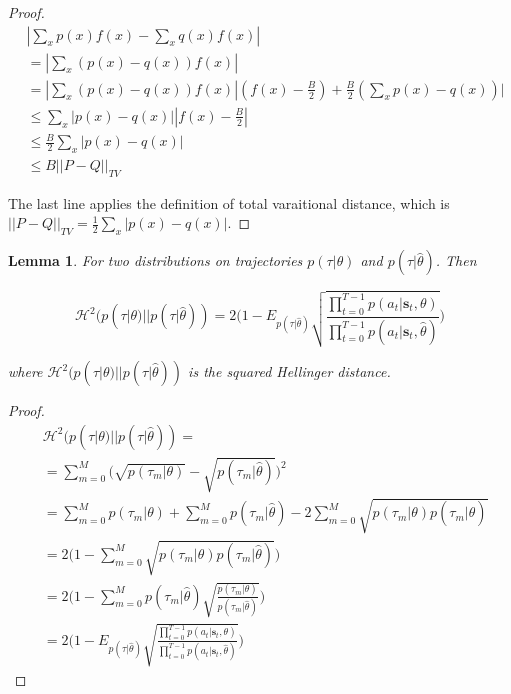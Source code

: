 \documentclass[conference]{article}
\newcommand{\bs}{\mathbf{s}}
\newtheorem{lemma}[theorem]{Lemma}
\newtheorem{proof}[theorem]{proof}
\begin{document}
\begin{proof}
\begin{align}
&|\sum_x p(x)f(x) - \sum_x q(x)f(x)| \nonumber \\
&= |\sum_x (p(x)-q(x))f(x)|  \nonumber \\
&=|\sum_x (p(x)-q(x))f(x)|(f(x) - \frac{B}{2}) + \frac{B}{2}(\sum_x p(x) - q(x))| \nonumber \\
&\leq \sum_x |p(x)-q(x)||f(x) - \frac{B}{2}| \nonumber \\
&\leq \frac{B}{2} \sum_x |p(x)-q(x)|\nonumber \\
& \leq B ||P-Q||_{TV}
\end{align}

The last line applies the definition of total varaitional distance, which is $||P-Q||_{TV} = \frac{1}{2} \sum_x |p(x)-q(x)|$.

\end{proof}

\begin{lemma}\label{lem:hellinger_exp}
For two distributions on trajectories $p(\tau|\theta)$ and $p(\tau|\hat{\theta})$. Then

$$\mathcal{H}^2(p(\tau|\theta)||p(\tau|\hat{\theta})) = 2\big(1-E_{p(\tau|\hat{\theta})} \sqrt{\frac{\prod^{T-1}_{t=0} p(a_t|\bs_t,\theta)}{\prod^{T-1}_{t=0} p(a_t|\bs_t,\hat{\theta})}}\big)$$

where $\mathcal{H}^2(p(\tau|\theta)||p(\tau|\hat{\theta}))$ is the squared Hellinger distance. 

\end{lemma}

\begin{proof}
\begin{align}
&\mathcal{H}^2(p(\tau|\theta) || p(\tau|\hat{\theta})) = \nonumber\\ 
&=\sum^M_{m=0} \big(\sqrt{p(\tau_m|\theta)} - \sqrt{p(\tau_m|\hat{\theta})} \big)^2 \nonumber \\ 
&=\sum^M_{m=0} p(\tau_m|\theta) + \sum^M_{m=0} p(\tau_m|\hat{\theta}) - 2 \sum^M_{m=0} \sqrt{p(\tau_m|\theta)p(\tau_m|\hat{\theta})} \nonumber \\
& = 2\big(1 - \sum^M_{m=0} \sqrt{p(\tau_m|\theta)p(\tau_m|\hat{\theta})} \big)\\
& =  2\big(1 - \sum^M_{m=0} p(\tau_m|\hat{\theta})\sqrt{\frac{p(\tau_m|\theta)}{p(\tau_m|\hat{\theta})} }\big)\\
&= 2\big(1-E_{p(\tau|\hat{\theta})} \sqrt{ \frac{\prod^{T-1}_{t=0} p(a_t|\bs_t,\theta)}{\prod^{T-1}_{t=0} p(a_t|\bs_t,\hat{\theta})}}\big)
\end{align}
\end{proof}



\end{document}
